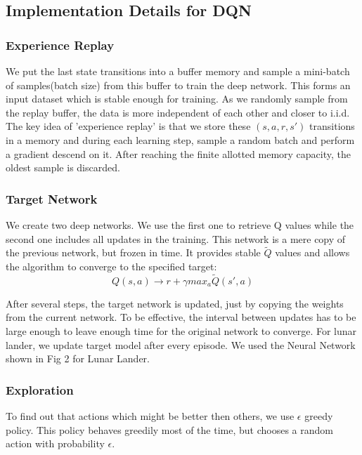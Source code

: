 \subsection{Implementation Details for DQN}

\subsubsection{Experience Replay}
We put the last state transitions into a buffer memory and sample a mini-batch of samples(batch size)  from this buffer to train the deep network. This forms an input dataset which is stable enough for training. As we randomly sample from the replay buffer, the data is more independent of each other and closer to i.i.d. 
\newline
The key idea of 'experience replay' is that we store these $(s, a, r, s')$ transitions in a memory and during each learning step, sample a random batch and perform a gradient descend on it. 
After reaching the finite allotted memory capacity, the oldest sample is discarded.
\newline

\subsubsection{Target Network}
We create two deep networks. We use the first one to retrieve Q values while the second one includes all updates in the training. This network is a mere copy of the previous network, but frozen in time. It provides stable $\tilde{Q}$ values and allows the algorithm to converge to the specified target:
\begin{equation}
Q(s, a) \xrightarrow{} r + \gamma max_a \tilde{Q}(s', a)
\end{equation}

After several steps, the target network is updated, just by copying the weights from the current network. To be effective, the interval between updates has to be large enough to leave enough time for the original network to converge. \newline
For lunar lander, we update target model after every episode. 
We used the Neural Network shown in Fig 2 for Lunar Lander.

\subsubsection{Exploration}
To find out that actions which might be better then others, we use $\epsilon$ greedy policy. This policy behaves greedily most of the time, but chooses a random action with probability $\epsilon$.

